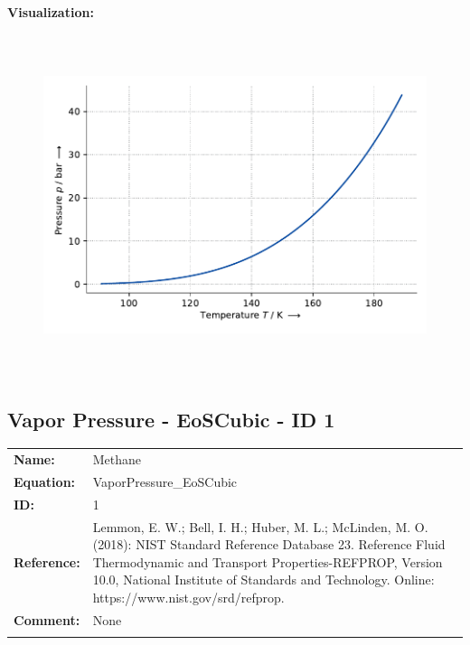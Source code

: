 \textbf{Visualization:}
%
\begin{figure}[!htp]
{\noindent\includegraphics[height=10cm, keepaspectratio]{figs/ref/ref_Methane_VaporPressure_EoS1_2.pdf}}
\end{figure}
%

\FloatBarrier
\newpage
\subsection{Vapor Pressure - EoSCubic - ID 1}
%
\begin{tabular}[l]{|lp{11.5cm}|}
\hline
\addlinespace

\textbf{Name:} & Methane \\
\textbf{Equation:} & VaporPressure\_EoSCubic \\
\textbf{ID:} & 1 \\
\textbf{Reference:} & Lemmon, E. W.; Bell, I. H.; Huber, M. L.; McLinden, M. O. (2018): NIST Standard Reference Database 23. Reference Fluid Thermodynamic and Transport Properties-REFPROP, Version 10.0, National Institute of Standards and Technology. Online: https://www.nist.gov/srd/refprop. \\
\textbf{Comment:} & None \\

\addlinespace
\hline
\end{tabular}
\newline


